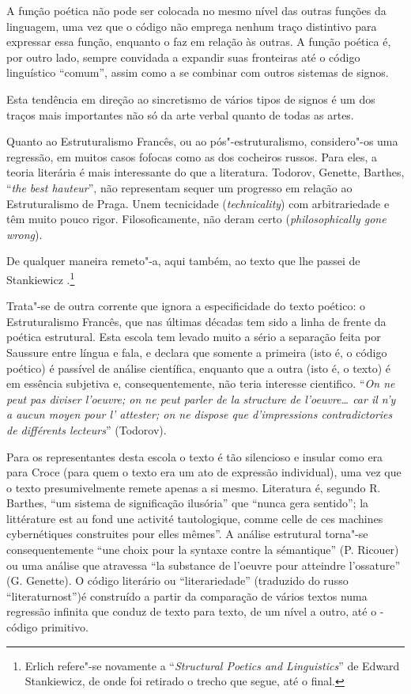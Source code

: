 A função poética não pode ser colocada no mesmo nível das outras funções
da linguagem, uma vez que o código não emprega nenhum traço distintivo
para expressar essa função, enquanto o faz em relação às outras. A
função poética é, por outro lado, sempre convidada a expandir suas
fronteiras até o código linguístico ``comum'', assim como a se combinar
com outros sistemas de signos.

Esta tendência em direção ao sincretismo de vários tipos de signos é um
dos traços mais importantes não só da arte verbal quanto de todas as
artes.

Quanto ao Estruturalismo Francês, ou ao pós"-estruturalismo, considero"-os
uma regressão, em muitos casos fofocas como as dos cocheiros russos.
Para eles, a teoria literária é mais interessante do que a literatura.
Todorov, Genette, Barthes, ``\emph{the best hauteur}'', não representam
sequer um progresso em relação ao Estruturalismo de Praga. Unem
tecnicidade (\emph{technicality}) com arbitrariedade e têm muito pouco
rigor. Filosoficamente, não deram certo (\emph{philosophically gone
wrong}).

De qualquer maneira remeto"-a, aqui também, ao texto que lhe passei de
Stankiewicz .\footnote{Erlich refere"-se novamente a ``\emph{Structural
  Poetics and Linguistics}'' de Edward Stankiewicz, de onde foi retirado
  o trecho que segue, até o final.}

Trata"-se de outra corrente que ignora a especificidade do texto poético:
o Estruturalismo Francês, que nas últimas décadas tem sido a linha de
frente da poética estrutural. Esta escola tem levado muito a sério a
separação feita por Saussure entre língua e fala, e declara que somente
a primeira (isto é, o código poético) é passível de análise científica,
enquanto que a outra (isto é, o texto) é em essência subjetiva e,
consequentemente, não teria interesse cientifico. ``\emph{On ne peut pas
diviser l'oeuvre; on ne peut parler de la structure de l'oeuvre\ldots{}
car il n'y a aucun moyen pour l' attester; on ne dispose que
d'impressions contradictories de différents lecteurs}'' (Todorov).

Para os representantes desta escola o texto é tão silencioso e insular
como era para Croce (para quem o texto era um ato de expressão
individual), uma vez que o texto presumivelmente remete apenas a si
mesmo. Literatura é, segundo R. Barthes, ``um sistema de significação
ilusória'' que ``nunca gera sentido''; la littérature est au fond une
activité tautologique, comme celle de ces machines cybernétiques
construites pour elles mêmes''. A análise estrutural torna"-se
consequentemente ``une choix pour la syntaxe contre la sémantique'' (P.
Ricouer) ou uma análise que atravessa ``la substance de l'oeuvre pour
atteindre l'ossature'' (G. Genette). O código literário ou
``literariedade'' (traduzido do russo ``literaturnost'')é construído a
partir da comparação de vários textos numa regressão infinita que conduz
de texto para texto, de um nível a outro, até o -código primitivo.

